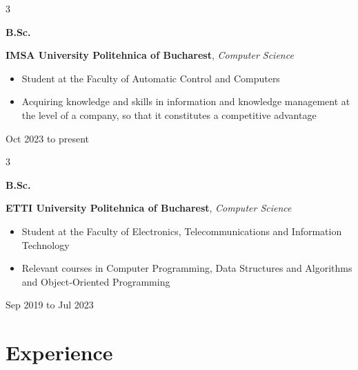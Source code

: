 \documentclass[10pt, letterpaper]{article}
\newenvironment{highlights}{
    \begin{itemize}[
        topsep=0.10 cm,
        parsep=0.10 cm,
        partopsep=0pt,
        itemsep=0pt,
        leftmargin=0.4 cm + 10pt
    ]
}{
    \end{itemize}
} %
\newenvironment{threecolentry}[3][]{
    \onecolentry
    \def\thirdColumn{#3}
    \setcolumnwidth{1 cm, \fill, 3.5 cm}
    \begin{paracol}{3}
    {\raggedright #2} \switchcolumn
}{
    \switchcolumn \raggedleft \thirdColumn
    \end{paracol}
    \endonecolentry
} %
\begin{document}
        
        \begin{threecolentry}{\textbf{B.Sc.}}{
            Oct 2023 to present
        }
            \textbf{IMSA University Politehnica of Bucharest}, \textit{Computer Science}
            \begin{highlights}
                \item Student at the Faculty of Automatic Control and Computers
                \item Acquiring knowledge and skills in information and knowledge management at the level of a company, so that it constitutes a competitive advantage
            \end{highlights}
        \end{threecolentry}

        \vspace{0.2 cm}

        \begin{threecolentry}{\textbf{B.Sc.}}{
            Sep 2019 to Jul 2023
        }
            \textbf{ETTI University Politehnica of Bucharest}, \textit{Computer Science}
            \begin{highlights}
                \item Student at the Faculty of Electronics, Telecommunications and Information Technology
                \item Relevant courses in Computer Programming, Data Structures and Algorithms and Object‑Oriented Programming
            \end{highlights}
        \end{threecolentry}


    
    \section{Experience}
\end{document}
